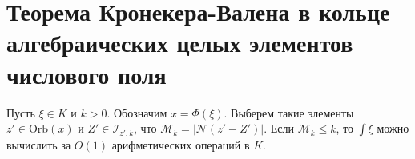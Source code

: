 \documentclass[_00_dissertation.tex]{subfiles}
\begin{document}
\section{Теорема Кронекера-Валена в кольце алгебраических целых элементов числового поля}


\begin{lemma}
    Пусть $\xi \in K$ и $k > 0$.
    Обозначим $x = \Phi(\xi)$.
    Выберем такие элементы $z' \in \textrm{Orb}(x)$ и $Z'\in\mathcal{I}_{z', k}$, что $\mathcal{M}_k = |\mathcal{N}(z'-Z')|$.
    Если $\mathcal{M}_k \le k$, то $\int{\xi}$ можно вычислить за $O(1)$ арифметических операций в $K$.
\end{lemma}
\end{document}

